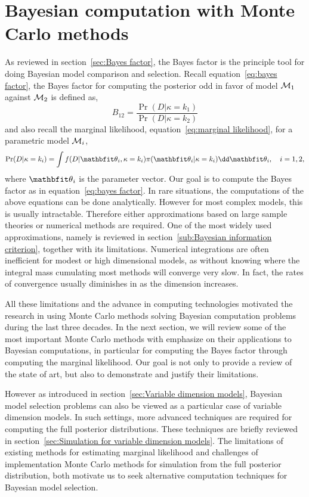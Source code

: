 \chapter{Bayesian computation with Monte Carlo methods}
\label{cha:Bayesian computation with Monte Carlo methods}

As reviewed in section~\ref{sec:Bayes factor}, the Bayes factor is the
principle tool for doing Bayesian model comparison and selection. Recall
equation~\eqref{eq:bayes factor}, the Bayes factor for computing the posterior
odd in favor of model $\mathcal{M}_1$ against $\mathcal{M}_2$ is defined as,
\[
  B_{12} = \frac{\Pr(D|\kappa=k_1)}{\Pr(D|\kappa=k_2)}
\]
and also recall the marginal likelihood, equation~\eqref{eq:marginal
  likelihood}, for a parametric model $\mathcal{M}_i$,
\[
  \Pr(D|\kappa=k_i)
  = \int f(D|\bth_i,\kappa=k_i)\pi(\bth_i|\kappa=k_i)\dd\bth_i,
  \quad i = 1, 2,
\]
where $\bth_i$ is the parameter vector. Our goal is to compute the Bayes
factor as in equation~\eqref{eq:bayes factor}. In rare situations, the
computations of the above equations can be done analytically. However for most
complex models, this is usually intractable. Therefore either approximations
based on large sample theories or numerical methods are required. One of the
most widely used approximations, namely \bic is reviewed in
section~\ref{sub:Bayesian information criterion}, together with its
limitations. Numerical integrations are often inefficient for modest or high
dimensional models, as without knowing where the integral mass cumulating most
methods will converge very slow. In fact, the rates of convergence usually
diminishes in as the dimension increases.

All these limitations and the advance in computing technologies motivated the
research in using Monte Carlo methods solving Bayesian computation problems
during the last three decades. In the next section, we will review some of the
most important Monte Carlo methods with emphasize on their applications to
Bayesian computations, in particular for computing the Bayes factor through
computing the marginal likelihood. Our goal is not only to provide a review of
the state of art, but also to demonstrate and justify their limitations.

However as introduced in section~\ref{sec:Variable dimension models}, Bayesian
model selection problems can also be viewed as a particular case of variable
dimension models. In such settings, more advanced techniques are required for
computing the full posterior distributions. These techniques are briefly
reviewed in section~\ref{sec:Simulation for variable dimension models}. The
limitations of existing methods for estimating marginal likelihood and
challenges of implementation Monte Carlo methods for simulation from the full
posterior distribution, both motivate us to seek alternative computation
techniques for Bayesian model selection.

